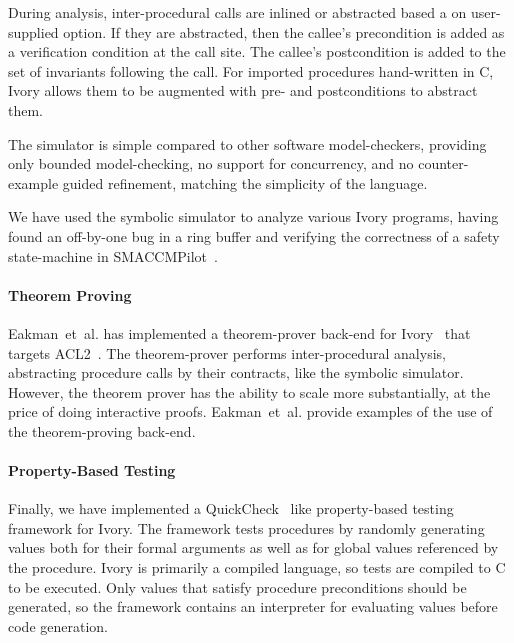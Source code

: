 During analysis, inter-procedural calls are inlined or abstracted based a on
user-supplied option. If they are abstracted, then the callee's precondition is
added as a verification condition at the call site. The callee's postcondition
is added to the set of invariants following the call. For imported procedures
hand-written in C, Ivory allows them to be augmented with pre- and
postconditions to abstract them.

The simulator is simple compared to other software
model-checkers\cite{cbmc,cpachecker,ultiautomizer}, providing only bounded
model-checking, no support for concurrency, and no counter-example guided
refinement, matching the simplicity of the language.

We have used the symbolic simulator to analyze various Ivory programs, having
found an off-by-one bug in a ring buffer and verifying the correctness of a
safety state-machine in SMACCMPilot~\cite{}.

\paragraph{Theorem Proving}

Eakman~et~al. has implemented a theorem-prover back-end for
Ivory~\cite{ivory-acl2} that targets ACL2~\cite{acl2}. The theorem-prover
performs inter-procedural analysis, abstracting procedure calls by their
contracts, like the symbolic simulator. However, the theorem prover has the
ability to scale more substantially, at the price of doing interactive
proofs. Eakman~et~al. provide examples of the use of the theorem-proving
back-end.

\paragraph{Property-Based Testing}

Finally, we have implemented a QuickCheck~\cite{} like property-based testing
framework for Ivory. The framework tests procedures by randomly generating
values both for their formal arguments as well as for global values referenced
by the procedure. Ivory is primarily a compiled language, so tests are compiled
to C to be executed. Only values that satisfy procedure preconditions should be
generated, so the framework contains an interpreter for evaluating values before
code generation.


